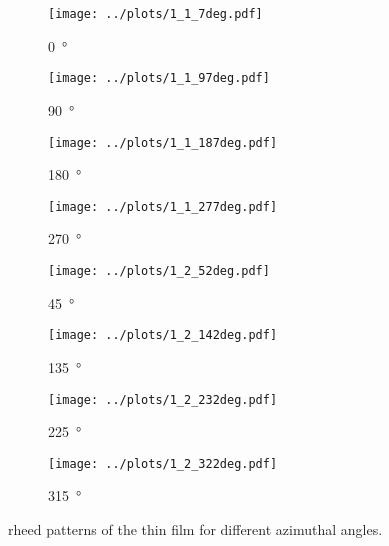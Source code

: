  \newpage
\begin{figure*}
    \centering
    \begin{subfigure}{0.2\linewidth}
        \texttt{[image: ../plots/1\_1\_7deg.pdf]}
        \caption{\qty{0}{\degree}}
    \end{subfigure}
    \begin{subfigure}{0.2\linewidth}
        \texttt{[image: ../plots/1\_1\_97deg.pdf]}
        \caption{\qty{90}{\degree}}
    \end{subfigure}
    \begin{subfigure}{0.2\linewidth}
        \texttt{[image: ../plots/1\_1\_187deg.pdf]}
        \caption{\qty{180}{\degree}}
    \end{subfigure}
    \begin{subfigure}{0.2\linewidth}
        \texttt{[image: ../plots/1\_1\_277deg.pdf]}
        \caption{\qty{270}{\degree}}
    \end{subfigure}

    \begin{subfigure}{0.2\linewidth}
        \texttt{[image: ../plots/1\_2\_52deg.pdf]}
        \caption{\qty{45}{\degree}}
    \end{subfigure}
    \begin{subfigure}{0.2\linewidth}
        \texttt{[image: ../plots/1\_2\_142deg.pdf]}
        \caption{\qty{135}{\degree}}
    \end{subfigure}
    \begin{subfigure}{0.2\linewidth}
        \texttt{[image: ../plots/1\_2\_232deg.pdf]}
        \caption{\qty{225}{\degree}}
    \end{subfigure}
    \begin{subfigure}{0.2\linewidth}
        \texttt{[image: ../plots/1\_2\_322deg.pdf]}
        \caption{\qty{315}{\degree}}
    \end{subfigure}

    \caption{\ac{rheed} patterns of the  thin film for different azimuthal 
    angles.}
    \label{fig:rheed1}
\end{figure*}

